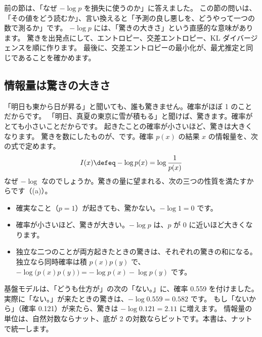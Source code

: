 前の節は、「なぜ $-\log p$ を損失に使うのか」に答えました。
この節の問いは、「その値をどう読むか」、言い換えると「予測の良し悪しを、どうやって一つの数で測るか」です。
$-\log p$ には、「驚きの大きさ」という直感的な意味があります。
驚きを出発点にして、エントロピー、交差エントロピー、KL ダイバージェンスを順に作ります。
最後に、交差エントロピーの最小化が、最尤推定と同じであることを確かめます。

\subsection*{情報量は驚きの大きさ}

「明日も東から日が昇る」と聞いても、誰も驚きません。確率がほぼ 1 のことだからです。
「明日、真夏の東京に雪が積もる」と聞けば、驚きます。確率がとても小さいことだからです。
起きたことの確率が小さいほど、驚きは大きくなります。
驚きを数にしたものが、です。確率 $p(x)$ の結果 $x$ の情報量を、次の式で定めます。
\begin{equation}
I(x)\defeq-\log p(x)=\log\frac{1}{p(x)}
\label{eq:math-information}
\end{equation}
なぜ $-\log$ なのでしょうか。驚きの量に望まれる、次の三つの性質を満たすからです（(a)）。
\begin{itemize}
\item 確実なこと（$p=1$）が起きても、驚かない。$-\log 1=0$ です。
\item 確率が小さいほど、驚きが大きい。$-\log p$ は、$p$ が 0 に近いほど大きくなります。
\item 独立な二つのことが両方起きたときの驚きは、それぞれの驚きの和になる。
  独立なら同時確率は積 $p(x)p(y)$ で、$-\log\bigl(p(x)p(y)\bigr)=-\log p(x)-\log p(y)$ です。
\end{itemize}
基盤モデルは、「どうも仕方が」の次の「ない。」に、確率 0.559 を付けました。
実際に「ない。」が来たときの驚きは、$-\log 0.559=0.582$ です。
もし「ないから」（確率 0.121）が来たら、驚きは $-\log 0.121=2.11$ に増えます。
情報量の単位は、自然対数ならナット、底が 2 の対数ならビットです。本書は、ナットで統一します。

